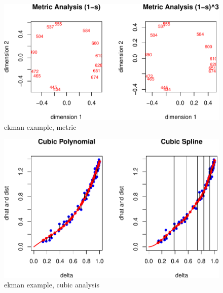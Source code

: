 \documentclass[
  12pt,
]{article}
\begin{document}
\begin{figure}

{\centering \includegraphics{smacofBS_files/figure-latex/ekmanmetricconf-1} 

}

\caption{ekman example, metric}\label{fig:ekmanmetricconf}
\end{figure}

\begin{figure}

{\centering \includegraphics{smacofBS_files/figure-latex/ekmancubic-1} 

}

\caption{ekman example, cubic analysis}\label{fig:ekmancubic}
\end{figure}
\end{document}
